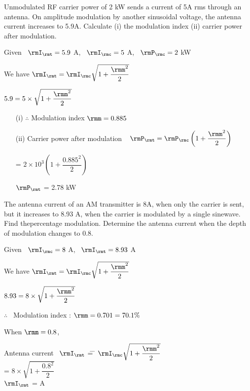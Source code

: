 \begin{problem}\label{prob8.13}
Unmodulated RF carrier power of 2 kW sends a current of 5A rms through
an antenna. On amplitude modulation by another sinusoidal voltage, the
antenna current increases to 5.9A. Calculate (i) the modulation index
(ii) carrier power after modulation.
\end{problem}

\begin{solution}
Given ~$\rmI_\rmt = 5.9$ A, ~$\rmI_\rmc = 5$ A, ~$\rmP_\rmc = 2$ kW

\medskip
We have $\rmI_\rmt = \rmI_\rmc \sqrt{1+\dfrac{\rmm^2}{2}}$

\smallskip
\hspace{1.1cm} $5.9 = 5 \times \sqrt{1+\dfrac{\rmm^2}{2}}$
\begin{itemize}
\item[(i)] $\therefore$ Modulation index $\rmm = 0.885$

\item[(ii)] Carrier power after modulation ~ $\rmP_\rmt =
\rmP_\rmc \left(1+ \dfrac{\rmm^2}{2} \right)$

\hspace{5.4cm} = $2 \times 10^3 \left(1+ \dfrac{0.885^2}{2} \right)$

\hspace{5cm} $\rmP_\rmt$ = 2.78 kW
\end{itemize}
\end{solution}

\begin{problem}\label{prob8.14}
The antenna current of an AM transmitter is 8A, when only the carrier
is sent, but it increases to 8.93 A, when the carrier is modulated by
a single sinewave. Find the\break percentage modulation. Determine the
antenna current when the depth of modulation changes to 0.8.
\end{problem}

\begin{solution}
Given ~$\rmI_\rmc = 8$ A, ~$\rmI_\rmt =8.93$ A

\medskip
We have $\rmI_\rmt = \rmI_\rmc \sqrt{1+\dfrac{\rmm^2}{2}}$

\medskip
\hspace{0.9cm} $8.93 = 8\times \sqrt{1+\dfrac{\rmm^2}{2}}$

\smallskip
$\therefore$ ~Modulation index : $\rmm = 0.701 = 70.1 \%$

When $\rmm = 0.8$,
\begin{tabbing}
Antenna current ~$\rmI_\rmt$ \= =  \= $\rmI_\rmc \sqrt{1+\dfrac{\rmm^2}{2}}$\\[0.1cm]
\> = \> $8 \times \sqrt{1+\dfrac{0.8^2}{2}}$\\[4pt]
\hspace{2.6cm} $\rmI_\rmt$ \> =  A
\end{tabbing}
\end{solution}

